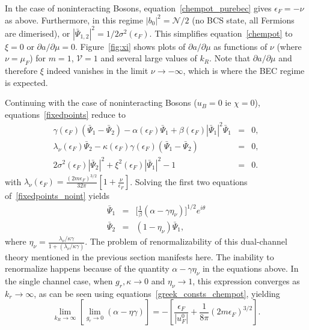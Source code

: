 \documentclass[a4paper,10pt]{article}
\begin{document}
In the case of noninteracting Bosons, equation~\ref{chempot_purebec} gives $\epsilon_F=-\nu$ as above. Furthermore, in this regime $|b_0|^2=\mathcal{N}/2$ (no BCS state, all Fermions are dimerised), or $|\bar{\Psi}_{1,2}|^2 = 1/2\sigma^2(\epsilon_F)$. This simplifies equation~\ref{chempot} to $\xi = 0$ or  $\partial a/\partial\mu = 0$. Figure~\ref{fig:xi} shows plots of $\partial a/\partial\mu $ as functions of $\nu$ (where $\nu= \mu_F$) for $m=1$, $\mathcal{V}=1$ and several large values of $k_R$. Note that  $\partial a/\partial\mu $ and therefore $\xi$ indeed vanishes in the limit $\nu \rightarrow -\infty$, which is where the BEC regime is expected.

Continuing with the case of noninteracting Bosons ($u_B=0$ ie $\chi=0$), equations~\ref{fixedpoints} reduce to 
\begin{eqnarray}
\label{fixedpoints_noint}
\gamma\left(\epsilon_F\right) \left(  \bar{\Psi}_1- \bar{\Psi}_2 \right) - \alpha\left(\epsilon_F\right)  \bar{\Psi}_1 +\beta\left(\epsilon_F\right) | \bar{\Psi}_1|^2  \bar{\Psi}_1 &=& 0, \nonumber \\
\lambda_\nu\left(\epsilon_F\right)  \bar{\Psi}_2 - \kappa\left(\epsilon_F\right)\gamma\left(\epsilon_F\right) \left( \bar{\Psi}_1- \bar{\Psi}_2 \right) &=& 0, \nonumber \\
2 \sigma^2(\epsilon_F) | \bar{\Psi}_2|^2 + \xi^2(\epsilon_F) | \bar{\Psi}_1|^2 -1 &=& 0.
\end{eqnarray}
with $\lambda_\nu(\epsilon_F)=\frac{(2m\epsilon_F)^{3/2}}{32\pi}[1+\frac{\nu}{\epsilon_F}]$. Solving the first two equations of~\ref{fixedpoints_noint} yields
\begin{eqnarray}
\label{fixedpoints_noint_final}
 \bar{\Psi}_1 &=& \bigg[\frac{1}{\beta} \left(\alpha - \gamma\eta_\nu \right)\bigg]^{1/2} e^{i\theta} \nonumber \\
 \bar{\Psi}_2 &=& \left( 1-\eta_\nu\right)  \bar{\Psi}_1,
\end{eqnarray}
where $\eta_\nu=\frac{\lambda_\nu/\kappa\gamma}{1+\left(\lambda_\nu/\kappa\gamma\right)}$.  {The problem of renormalizability of this dual-channel theory mentioned in the previous section manifests here. The inability to renormalize happens because of the quantity $\alpha-\gamma\eta_\nu$ in the equations above. In the single channel case, when $g_r, \kappa\rightarrow0$ and $\eta_\nu\rightarrow 1$, this expression converges as $k_r\rightarrow \infty$, as can be seen using equations}~\ref{greek_consts_chempot},  {yielding}
\begin{equation}
\lim_{k_R\rightarrow\infty}\left[\lim_{g_r\rightarrow0}\left(\alpha-\eta\gamma\right)\right] = -\left[\frac{\epsilon_F}{|u^0_F|}+\frac{1}{8\pi}(2m\epsilon_F)^{3/2}\right].
\end{equation}
\end{document}
